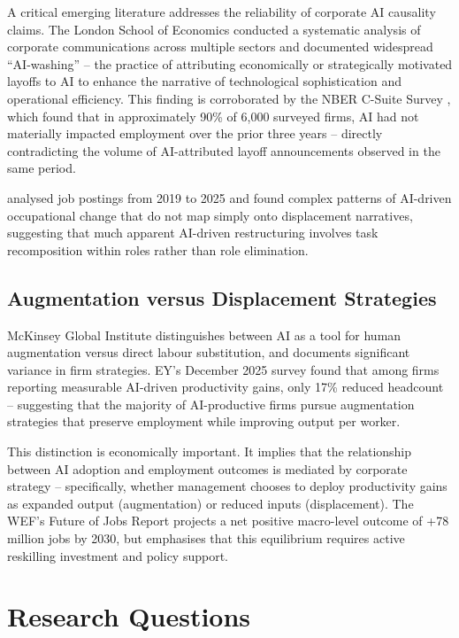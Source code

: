 \documentclass[12pt, a4paper]{article}
\begin{document}
A critical emerging literature addresses the reliability of corporate AI causality claims.
The London School of Economics \citeyearpar{lse2025} conducted a systematic analysis of
corporate communications across multiple sectors and documented widespread ``AI-washing'' --
the practice of attributing economically or strategically motivated layoffs to AI to enhance
the narrative of technological sophistication and operational efficiency. This finding is
corroborated by the NBER C-Suite Survey \citeyearpar{nber2025}, which found that in
approximately 90\% of 6,000 surveyed firms, AI had not materially impacted employment over
the prior three years -- directly contradicting the volume of AI-attributed layoff
announcements observed in the same period.

\citet{srinivasan2025} analysed job postings from 2019 to 2025 and found complex patterns of
AI-driven occupational change that do not map simply onto displacement narratives, suggesting
that much apparent AI-driven restructuring involves task recomposition within roles rather
than role elimination.

\subsection{Augmentation versus Displacement Strategies}

McKinsey Global Institute \citeyearpar{mckinsey2025} distinguishes between AI as a tool for
human augmentation versus direct labour substitution, and documents significant variance in
firm strategies. EY's December 2025 survey \citeyearpar{ey2025} found that among firms
reporting measurable AI-driven productivity gains, only 17\% reduced headcount -- suggesting
that the majority of AI-productive firms pursue augmentation strategies that preserve
employment while improving output per worker.

This distinction is economically important. It implies that the relationship between AI
adoption and employment outcomes is mediated by corporate strategy -- specifically, whether
management chooses to deploy productivity gains as expanded output (augmentation) or reduced
inputs (displacement). The WEF's \citeyearpar{wef2025} Future of Jobs Report projects a
net positive macro-level outcome of +78 million jobs by 2030, but emphasises that this
equilibrium requires active reskilling investment and policy support.

\section{Research Questions}
\end{document}

